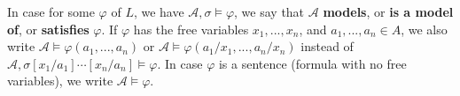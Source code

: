 \documentclass[12pt]{article}
\begin{document}
In case for some $\varphi$ of $L$, we have $\mathcal{A},\sigma\models\varphi$, we say that $\mathcal{A}$ {\bf models}, or {\bf is a model of}, or {\bf satisfies} $\varphi$.  If $\varphi$ has the free variables $x_1,...,x_n$, and $a_1,...,a_n\in A$, we also write $\mathcal{A}\models\varphi(a_1,...,a_n)$ or $\mathcal{A}\models\varphi(a_1/x_1,...,a_n/x_n)$ instead of $\mathcal{A},\sigma[x_1/a_1]\cdots[x_n/a_n]\models\varphi$.  In case $\varphi$ is a sentence (formula with no free variables), we write $\mathcal{A}\models\varphi$.
\end{document}
